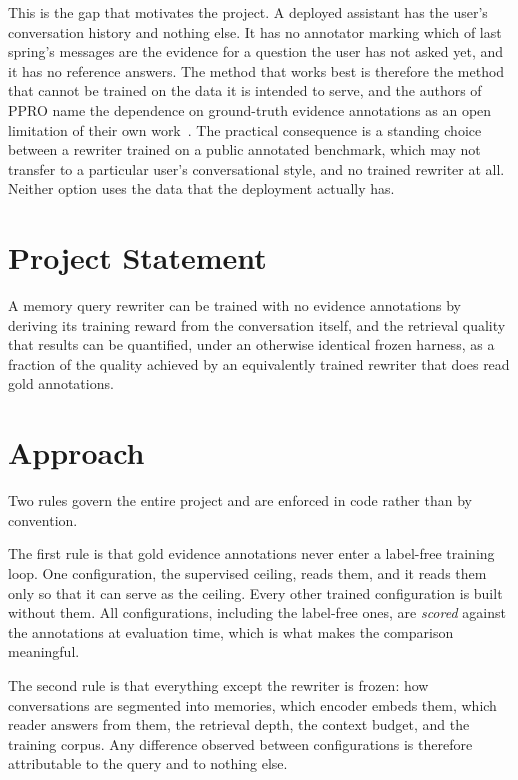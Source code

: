 \documentclass[12pt,letterpaper,oneside]{report}
\begin{document}
This is the gap that motivates the project. A deployed assistant has the user's
conversation history and nothing else. It has no annotator marking which of
last spring's messages are the evidence for a question the user has not asked
yet, and it has no reference answers. The method that works best is therefore
the method that cannot be trained on the data it is intended to serve, and the
authors of PPRO name the dependence on ground-truth evidence annotations as an
open limitation of their own work~\cite{ppro}. The practical consequence is a
standing choice between a rewriter trained on a public annotated benchmark,
which may not transfer to a particular user's conversational style, and no
trained rewriter at all. Neither option uses the data that the deployment
actually has.

\section{Project Statement}
\label{sec:statement}

A memory query rewriter can be trained with no evidence annotations by deriving
its training reward from the conversation itself, and the retrieval quality
that results can be quantified, under an otherwise identical frozen harness, as
a fraction of the quality achieved by an equivalently trained rewriter that
does read gold annotations.

\section{Approach}
\label{sec:approach}

Two rules govern the entire project and are enforced in code rather than by
convention.

The first rule is that gold evidence annotations never enter a label-free
training loop. One configuration, the supervised ceiling, reads them, and it
reads them only so that it can serve as the ceiling. Every other trained
configuration is built without them. All configurations, including the
label-free ones, are \emph{scored} against the annotations at evaluation time,
which is what makes the comparison meaningful.

The second rule is that everything except the rewriter is frozen: how
conversations are segmented into memories, which encoder embeds them, which
reader answers from them, the retrieval depth, the context budget, and the
training corpus. Any difference observed between configurations is therefore
attributable to the query and to nothing else.
\end{document}
